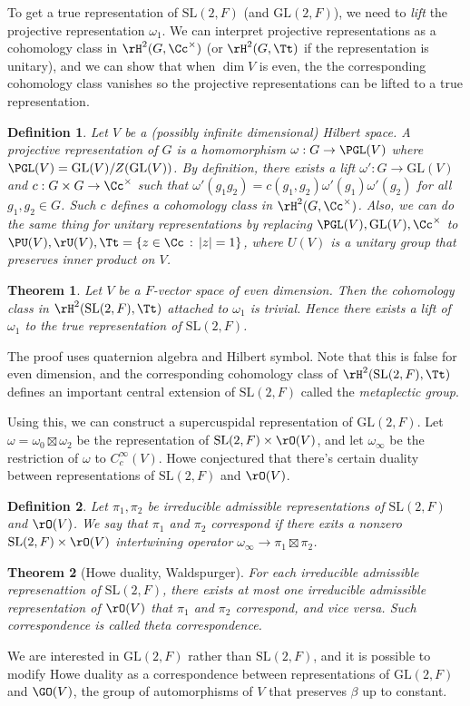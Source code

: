 \documentclass{article}
\newtheorem{theorem}{Theorem}[section]
\newtheorem{definition}{Definition}[section]
\newcommand{\GL}{\mathrm{GL}}
\newcommand{\SL}{\mathrm{SL}}
\begin{document}
To get a true representation of $\SL(2, F)$ (and $\GL(2, F)$), we need to \emph{lift} the projective representation $\omega_1$. 
We can interpret projective representations as a cohomology class in $\rH^{2}(G, \Cc^{\times})$ (or $\rH^{2}(G, \Tt)$ if the representation is unitary), and we can show that when $\dim V$ is even, the the corresponding cohomology class vanishes so the projective representations can be lifted to a true representation. 
\begin{definition}
Let $V$ be a (possibly infinite dimensional) Hilbert space. 
A projective representation of $G$ is a homomorphism $\omega : G\to \PGL(V)$ where $\PGL(V) = \GL(V)/Z(\GL(V))$. By definition, there exists a lift $\omega' : G\to \GL(V)$ and $c:G\times G\to \Cc^{\times}$ such that $\omega'(g_{1}g_{2}) = c(g_{1}, g_{2})\omega'(g_{1})\omega'(g_{2})$ for all $g_{1}, g_{2}\in G$. 
Such $c$ defines a cohomology class in $\rH^{2}(G, \Cc^{\times})$. 
Also, we can do the same thing for unitary representations by replacing $\PGL(V), \GL(V), \Cc^{\times}$ to $\PU(V), \rU(V), \Tt = \{z\in \Cc\,:\, |z| = 1\}$, where $U(V)$ is a unitary group that preserves inner product on $V$. 
\end{definition}

\begin{theorem}
Let $V$ be a $F$-vector space of even dimension. Then the cohomology class in $\rH^{2}(\SL(2, F), \Tt)$ attached to $\omega_1$ is trivial. 
Hence there exists a lift of $\omega_1$ to the true representation of $\SL(2, F)$.  
\end{theorem}
The proof uses quaternion algebra and Hilbert symbol. 
Note that this is false for even dimension, and the corresponding cohomology class of $\rH^{2}(\SL(2, F), \Tt)$ defines an important central extension of $\SL(2, F)$ called the \emph{metaplectic group}. 

Using this, we can construct a supercuspidal representation of $\GL(2, F)$. 
Let $\omega = \omega_{0}\boxtimes \omega_{2}$ be the representation of $\SL(2, F)\times \rO(V)$, and let $\omega_\infty$ be the restriction of $\omega$ to $C_{c}^{\infty}(V)$. 
Howe conjectured that there's certain duality between representations of $\SL(2, F)$ and $\rO(V)$. 
\begin{definition}
Let $\pi_1, \pi_2$ be irreducible admissible representations of $\SL(2, F)$ and $\rO(V)$. 
We say that $\pi_1$ and $\pi_2$ correspond if there exits a nonzero $\SL(2, F)\times \rO(V)$ intertwining operator $\omega_\infty \to \pi_1\boxtimes \pi_2$. 
\end{definition}
\begin{theorem}[Howe duality, Waldspurger]
For each irreducible admissible represenattion of $\SL(2, F)$, there exists at most one irreducible admissible representation of $\rO(V)$ that $\pi_1$ and $\pi_2$ correspond, and vice versa. 
Such correspondence is called theta correspondence. 
\end{theorem}
We are interested in $\GL(2, F)$ rather than $\SL(2, F)$, and it is possible to modify Howe duality as a correspondence between representations of $\GL(2, F)$ and $\GO(V)$, the group of automorphisms of $V$ that preserves $\beta$ up to constant. 
\end{document}
